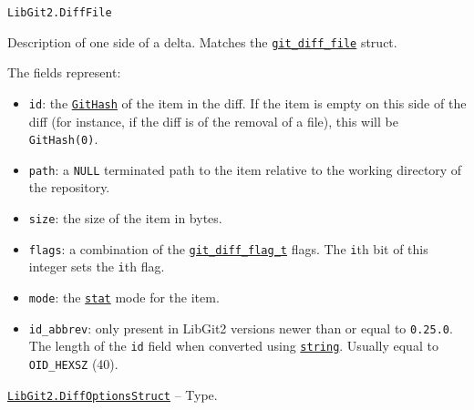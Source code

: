 \begin{adjustwidth}{2em}{0pt}


\begin{verbatim}
LibGit2.DiffFile
\end{verbatim}

Description of one side of a delta. Matches the \href{https://libgit2.org/libgit2/\#HEAD/type/git\_diff\_file}{\texttt{git\_diff\_file}} struct.

The fields represent:

\begin{itemize}
\item \texttt{id}: the \hyperlink{202290709580230708}{\texttt{GitHash}} of the item in the diff. If the item is empty on this  side of the diff (for instance, if the diff is of the removal of a file), this will  be \texttt{GitHash(0)}.


\item \texttt{path}: a \texttt{NULL} terminated path to the item relative to the working directory of the repository.


\item \texttt{size}: the size of the item in bytes.


\item \texttt{flags}: a combination of the \href{https://libgit2.org/libgit2/\#HEAD/type/git\_diff\_flag\_t}{\texttt{git\_diff\_flag\_t}}  flags. The \texttt{i}th bit of this integer sets the \texttt{i}th flag.


\item \texttt{mode}: the \hyperlink{10861694406169986183}{\texttt{stat}} mode for the item.


\item \texttt{id\_abbrev}: only present in LibGit2 versions newer than or equal to \texttt{0.25.0}.  The length of the \texttt{id} field when converted using \hyperlink{7919678712989769360}{\texttt{string}}. Usually equal to \texttt{OID\_HEXSZ} (40).

\end{itemize}


\end{adjustwidth}
\hypertarget{12061588653487632733}{} 
\hyperlink{12061588653487632733}{\texttt{LibGit2.DiffOptionsStruct}}  -- {Type.}

